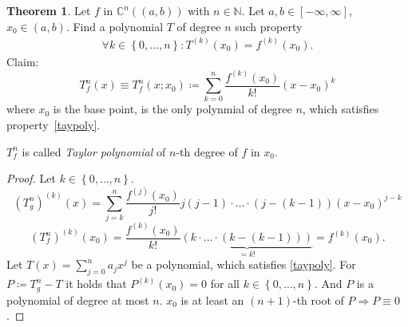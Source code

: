 \documentclass[a4paper,landscape,twocolumn]{article}
\theoremstyle{definition}
\newtheorem{theorem}{Theorem}
\newcommand\set[1]{\left\{#1\right\}}
\begin{document}
\begin{theorem}
  Let $f$ in $\mathbb C^n((a,b))$ with $n \in \mathbb N$.
  Let $a,b \in [-\infty, \infty]$, $x_0 \in (a,b)$.
  Find a polynomial $T$ of degree $n$ such property
  \begin{align}
    \forall k \in \set{0,\ldots,n}: T^{(k)}(x_0) = f^{(k)}(x_0).
    \label{taypoly}
  \end{align}
  Claim:
  \[ T_f^n(x) \equiv T_f^n(x; x_0) \coloneqq \sum_{k=0}^n \frac{f^{(k)}(x_0)}{k!} (x - x_0)^k \]
  where $x_0$ is the base point, is the only polynmial of degree $n$, which satisfies
  property~\ref{taypoly}.

  $T_f^n$ is called \emph{Taylor polynomial} of $n$-th degree of $f$ in $x_0$.
\end{theorem}
\begin{proof}
  Let $k \in \set{0,\ldots,n}$.
  \[ (T_g^n)^{(k)}(x) = \sum_{j=k}^n \frac{f^{(j)}(x_0)}{j!} j (j-1) \cdot \ldots \cdot (j - (k-1))(x - x_0)^{j-k} \]
  \[
    \left(T_f^n\right)^{(k)} (x_0)
    = \frac{f^{(k)}(x_0)}{k!} \underbrace{\left(k \cdot \ldots \cdot (k - (k-1))\right)}_{= k!}
    = f^{(k)}(x_0).
  \]
  Let $T(x) = \sum_{j=0}^n a_j x^j$ be a polynomial, which satisfies \ref{taypoly}.
  For $P \coloneqq T_g^n - T$ it holds that $P^{(k)}(x_0) = 0$ for all $k \in \set{0,\ldots,n}$.
  And $P$ is a polynomial of degree at most $n$.
  $x_0$ is at least an $(n+1)$-th root of $P \Rightarrow P \equiv 0$.
\end{proof}
\end{document}
